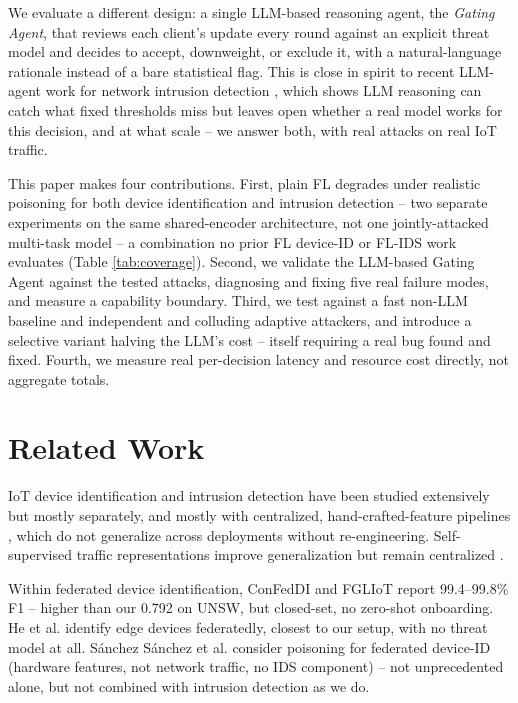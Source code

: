 \documentclass[conference]{IEEEtran}
\begin{document}
We evaluate a different design: a single LLM-based reasoning agent, the \emph{Gating Agent}, that reviews each client's update every round against an explicit threat model and decides to accept, downweight, or exclude it, with a natural-language rationale instead of a bare statistical flag. This is close in spirit to recent LLM-agent work for network intrusion detection \cite{islam2026maids,jamshidi2026trillm}, which shows LLM reasoning can catch what fixed thresholds miss but leaves open whether a real model works for this decision, and at what scale -- we answer both, with real attacks on real IoT traffic.

This paper makes four contributions. First, plain FL degrades under realistic poisoning for both device identification and intrusion detection -- two separate experiments on the same shared-encoder architecture, not one jointly-attacked multi-task model -- a combination no prior FL device-ID or FL-IDS work evaluates (Table \ref{tab:coverage}). Second, we validate the LLM-based Gating Agent against the tested attacks, diagnosing and fixing five real failure modes, and measure a capability boundary. Third, we test against a fast non-LLM baseline and independent and colluding adaptive attackers, and introduce a selective variant halving the LLM's cost -- itself requiring a real bug found and fixed. Fourth, we measure real per-decision latency and resource cost directly, not aggregate totals.

\section{Related Work}
\label{sec:relwork}
IoT device identification and intrusion detection have been studied extensively but mostly separately, and mostly with centralized, hand-crafted-feature pipelines \cite{meidan2017profiliot}, which do not generalize across deployments without re-engineering. Self-supervised traffic representations improve generalization but remain centralized \cite{sivanathan2026generalizable}.

Within federated device identification, ConFedDI \cite{chen2025confeddi} and FGLIoT \cite{wang2025fgliot} report 99.4--99.8\% F1 -- higher than our 0.792 on UNSW, but closed-set, no zero-shot onboarding. He et al. \cite{he2021edge} identify edge devices federatedly, closest to our setup, with no threat model at all. S\'anchez S\'anchez et al. \cite{sanchez2021robust} consider poisoning for federated device-ID (hardware features, not network traffic, no IDS component) -- not unprecedented alone, but not combined with intrusion detection as we do.
\end{document}
